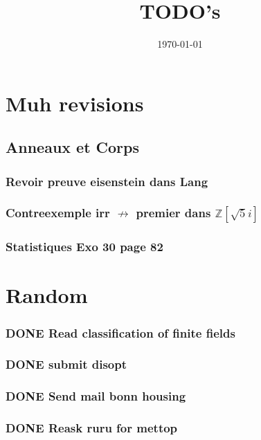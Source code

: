 \documentclass[11pt]{article}
\date{\today}
\title{TODO's}
\begin{document}
\maketitle
\tableofcontents

\section{Muh revisions}
\label{sec:org4d877c4}
\subsection{Anneaux et Corps}
\label{sec:org0ec1331}
\subsubsection{Revoir preuve eisenstein dans Lang}
\label{sec:org395e4e8}
\subsubsection{Contreexemple irr \(\not\rightarrow\)  premier dans \(\mathbb{Z}[\sqrt{5}i]\)}
\label{sec:org5396657}
\subsubsection{Statistiques Exo 30 page 82}
\label{sec:org1113f77}

\section{Random}
\label{sec:orgc28c2cc}
\subsubsection{{\bfseries\sffamily DONE} Read classification of finite fields}
\label{sec:orgfc43e2d}
\subsubsection{{\bfseries\sffamily DONE} submit disopt}
\label{sec:orgad52f6f}
\subsubsection{{\bfseries\sffamily DONE} Send mail bonn housing}
\label{sec:org8997d8f}
\subsubsection{{\bfseries\sffamily DONE} Reask ruru for mettop}
\label{sec:orgb96a042}
\end{document}
